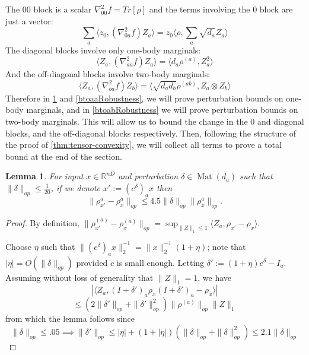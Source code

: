 \documentclass[aos]{imsart}
\newtheorem{lemma}[theorem]{Lemma}
\theoremstyle{definition}
\numberwithin{equation}{section}
\DeclareMathOperator{\mat}{Mat}
\newcommand{\R}{{\mathbb{R}}}
\newcommand{\samp}{x}
\begin{document}
\begin{appendix}
The $00$ block is a scalar $\nabla^{2}_{00} f = Tr[\rho]$ and the terms involving the $0$ block are just a vector:
\[ \sum_{a} \langle z_{0}, (\nabla^{2}_{0a} f) Z_{a} \rangle = z_{0} \langle \rho, \sum_{a} \sqrt{d_{a}} Z_{a} \rangle       \]
The diagonal blocks involve only one-body marginals:
\[ \langle Z_{a}, (\nabla^{2}_{aa} f) Z_{a} \rangle = \langle d_{a} \rho^{(a)}, Z_{a}^{2} \rangle       \]
And the off-diagonal blocks involve two-body marginals:
\[ \langle Z_{a}, (\nabla^{2}_{ba} f) Z_{b} \rangle =  \langle \sqrt{d_{a} d_{b}} \rho^{(ab)}, Z_{a} \otimes Z_{b} \rangle   \]
Therefore in \cref{atoaaRobustness} and \cref{btoaaRobustness}, we will prove perturbation bounds on one-body marginals, and in \cref{btoabRobustness} we will prove perturbation bounds on two-body marginals. This will allow us to bound the change in the $0$ and diagonal blocks, and the off-diagonal blocks respectively. Then, following the structure of the proof of \cref{thm:tensor-convexity}, we will collect all terms to prove a total bound at the end of the section.



\begin{lemma} \label{atoaaRobustness}
For input $\samp \in \R^{nD}$ and perturbation $\delta \in \mat(d_{a})$ such that $\|\delta\|_{op} \leq \frac{1}{20}$, if we denote $\samp' := (e^{\delta})_{a} \samp$ then
\[ \|\rho_{\samp'}^{a} - \rho_{\samp}^{a}\|_{op} \leq 4.5 \|\delta\|_{op} \|\rho_{\samp}^{a}\|_{op}   . \]
\end{lemma}
\begin{proof} By definition, $\|\rho_{\samp'}^{(a)} - \rho_{\samp}^{(a)}\|_{op} = \sup_{\|Z\|_{1} \leq 1} \langle Z_{a}, \rho_{\samp'} - \rho_{\samp} \rangle $.


Choose $\eta$ such that  $\|(e^{\delta})_{a} \samp\|_{2}^{-1} = \|\samp\|_{2}^{-1} (1 + \eta)$; note that $|\eta| = O(\|\delta\|_{op})$ provided $c$ is small enough. Letting $\delta' := (1+\eta)e^{\delta} - I_{a}$. Assuming without loss of generality that $\|Z\|_{1} = 1$, we have
\[ | \langle Z_{a}, (I+\delta')_a \rho_{\samp} (I+\delta')_a - \rho_{\samp} \rangle | \]
\[ \leq (2\|\delta'\|_{op} + \|\delta'\|_{op}^{2}) \|\rho^{(a)}\|_{op} \|Z\|_{1}    \]
from which the lemma follows since
\[ \|\delta\|_{op} \leq .05 \implies \|\delta'\|_{op} \leq |\eta| + (1+|\eta|)(\|\delta\|_{op} + \|\delta\|_{op}^{2}) \leq  2.1 \|\delta\|_{op} \]
\end{proof}


\end{appendix}
\end{document}
